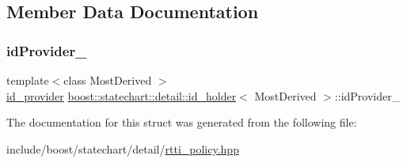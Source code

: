 \subsection{Member Data Documentation}
\mbox{\label{structboost_1_1statechart_1_1detail_1_1id__holder_a6d264be4c76a924c9f8d281edf791664}} 
\subsubsection{\texorpdfstring{id\+Provider\+\_\+}{idProvider\_}}
{\footnotesize\ttfamily template$<$class Most\+Derived $>$ \\
\mbox{\hyperlink{structboost_1_1statechart_1_1detail_1_1id__provider}{id\+\_\+provider}} \mbox{\hyperlink{structboost_1_1statechart_1_1detail_1_1id__holder}{boost\+::statechart\+::detail\+::id\+\_\+holder}}$<$ Most\+Derived $>$\+::id\+Provider\+\_\+\hspace{0.3cm}{\ttfamily [static]}}



The documentation for this struct was generated from the following file\+:\begin{DoxyCompactItemize}
\item 
include/boost/statechart/detail/\mbox{\hyperlink{rtti__policy_8hpp}{rtti\+\_\+policy.\+hpp}}\end{DoxyCompactItemize}
